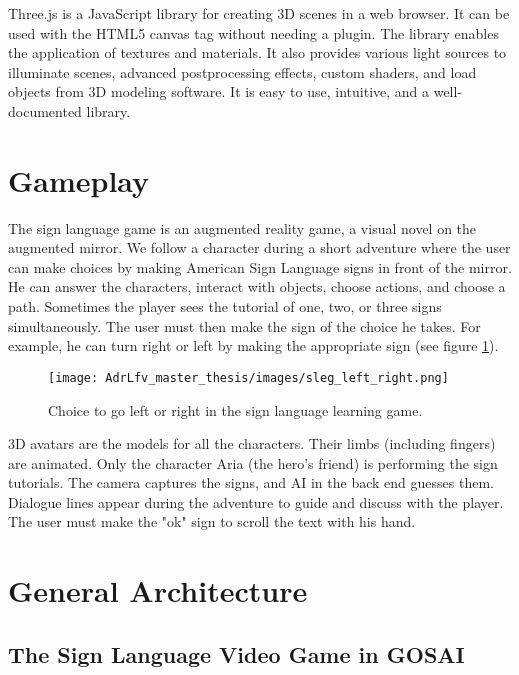 Three.js is a JavaScript library for creating 3D scenes in a web browser. It can be used with the HTML5 canvas tag without needing a plugin. The library enables the application of textures and materials. It also provides various light sources to illuminate scenes, advanced postprocessing effects, custom shaders, and load objects from 3D modeling software. It is easy to use, intuitive, and a well-documented library.

\section{Gameplay}

The sign language game is an augmented reality game, a visual novel on the augmented mirror. We follow a character during a short adventure where the user can make choices by making American Sign Language signs in front of the mirror. He can answer the characters, interact with objects, choose actions, and choose a path. 
Sometimes the player sees the tutorial of one, two, or three signs simultaneously. The user must then make the sign of the choice he takes. For example, he can turn right or left by making the appropriate sign (see figure \ref{fig:sleg_left_right}). 

\begin{figure}[h]
    \centering
    \texttt{[image: AdrLfv\_master\_thesis/images/sleg\_left\_right.png]}
    \caption{Choice to go left or right in the sign language learning game.}
    \label{fig:sleg_left_right}
\end{figure}

3D avatars are the models for all the characters. Their limbs (including fingers) are animated. Only the character Aria (the hero's friend) is performing the sign tutorials.
The camera captures the signs, and AI in the back end guesses them. Dialogue lines appear during the adventure to guide and discuss with the player. The user must make the "ok" sign to scroll the text with his hand.



\section{General Architecture}

\subsection{The Sign Language Video Game in GOSAI}


